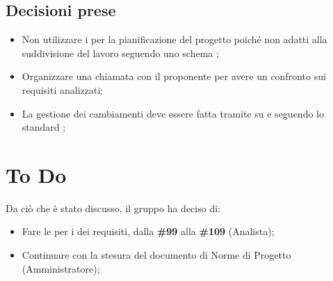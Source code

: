 \documentclass[a4paper, 12pt]{article}
\begin{document}
\subsection{Decisioni prese}
\begin{itemize}
    \item Non utilizzare i  per la pianificazione del progetto poiché non adatti alla suddivisione del lavoro seguendo uno schema ;
    \item Organizzare una chiamata con il proponente per avere un confronto sui requisiti analizzati;
    \item La gestione dei cambiamenti deve essere fatta tramite  su  e seguendo lo standard ;
\end{itemize}

\section{To Do}
Da ciò che è stato discusso, il gruppo ha deciso di:
\begin{itemize}
    \item Fare le  per i  dei requisiti, dalla \textbf{\#99} alla \textbf{\#109} (Analista);
    \item Continuare con la stesura del documento di Norme di Progetto (Amministratore);
\end{itemize}
\end{document}
